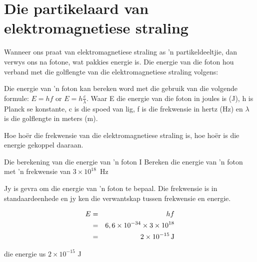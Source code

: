             \section{Die partikelaard van elektromagnetiese straling}
            \nopagebreak
      \label{m38778*id188832} Wanneer ons praat van elektromagnetiese straling as 'n partikeldeeltjie, dan verwys ons na fotone, wat pakkies energie is. Die energie van die foton hou verband met die golflengte van die elektromagnetiese straling volgens:\par 
\label{m38778*fhsst!!!underscore!!!id476} 
      \label{m38778*id188898} Die energie van 'n foton kan bereken word met die gebruik van die volgende formule: $E=hf$ or $E=h\frac{c}{\lambda }$.
Waar E die energie van die foton in joules is (J), h is Planck se konstante, c is die spoed van lig, f is die frekwensie in hertz (Hz) en $\lambda $ is die golflengte in meters (m).\par Hoe ho\"er die frekwensie van die e\-lek\-tro\-mag\-ne\-tie\-se straling is, hoe ho\"er is die energie gekoppel daaraan.  
\begin{wex}
{Die berekening van die energie van 'n foton I
}
{
Bereken die energie van 'n foton met 'n frekwensie van $3\ensuremath{\times}{10}^{18}$~Hz}
{
Jy is gevra om die energie van 'n foton te bepaal. Die frekwensie is in standaardeenhede en jy ken die verwantskap tussen frekwensie en energie.

\begin{eqnarray*}
E& =& hf\\ 
& =& 6,6\ensuremath{\times}{10}^{-34}\ensuremath{\times}3\ensuremath{\times}{10}^{18}\\ 
& =& 2\ensuremath{\times}{10}^{-15}\phantom{\rule{0.166667em}{0ex}}\text{J}
\end{eqnarray*}

die energie us $2\times10^{-15}$ J
}
\end{wex}
    
